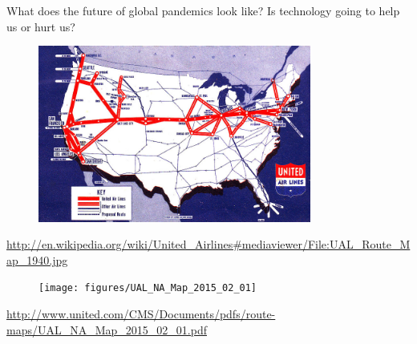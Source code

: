 \documentclass[aspectratio=169]{beamer}
\begin{document}
\begin{frame}

What does the future of global pandemics look like?  Is technology going to help us or hurt us?


\end{frame}
\begin{frame}

\begin{figure}
\includegraphics[width=0.8\textwidth]{figures/UAL_Route_Map_1940}
\end{figure}

\tiny{\url{http://en.wikipedia.org/wiki/United_Airlines\#mediaviewer/File:UAL_Route_Map_1940.jpg}}

\end{frame}
\begin{frame}

\begin{figure}
\texttt{[image: figures/UAL\_NA\_Map\_2015\_02\_01]}
\end{figure}

\tiny{\url{http://www.united.com/CMS/Documents/pdfs/route-maps/UAL_NA_Map_2015_02_01.pdf}}

\end{frame}
\end{document}
